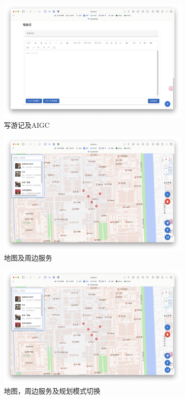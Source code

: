 \documentclass{ctexart}
\begin{document}
\begin{figure}[htbp]
    \centering
    \includegraphics[width=0.85\textwidth]{figure/write.png}
    \caption{写游记及AIGC}
\end{figure}

\begin{figure}[htbp]
    \centering
    \includegraphics[width=0.85\textwidth]{figure/map.png}
    \caption{地图及周边服务}
\end{figure}

\begin{figure}[htbp]
    \centering
    \includegraphics[width=0.85\textwidth]{figure/map.png}
    \caption{地图，周边服务及规划模式切换}
\end{figure}
\end{document}
